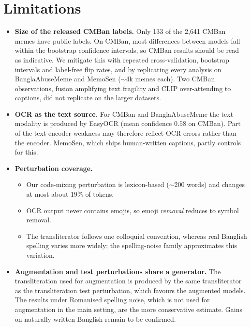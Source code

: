 \section*{Limitations}
\label{sec:limitations}

\begin{itemize}
  \item \textbf{Size of the released CMBan labels.} Only 133 of the 2{,}641 CMBan memes have public labels. On CMBan,
  most differences between models fall within the bootstrap confidence intervals, so CMBan results should be read
  as indicative. We mitigate this with repeated cross-validation, bootstrap intervals and label-free flip rates,
  and by replicating every analysis on BanglaAbuseMeme and MemoSen ($\sim$4k memes each). Two CMBan observations,
  fusion amplifying text fragility and CLIP over-attending to captions, did not replicate on the larger datasets.

  \item \textbf{OCR as the text source.} For CMBan and BanglaAbuseMeme the text modality is produced by EasyOCR
  (mean confidence $0.58$ on CMBan). Part of the text-encoder weakness may therefore reflect OCR errors rather than
  the encoder. MemoSen, which ships human-written captions, partly controls for this.

  \item \textbf{Perturbation coverage.}
  \begin{itemize}
    \item Our code-mixing perturbation is lexicon-based ($\sim$200 words) and changes at most about 19\% of tokens.
    \item OCR output never contains emojis, so emoji \emph{removal} reduces to symbol removal.
    \item The transliterator follows one colloquial convention, whereas real Banglish spelling varies more widely;
    the spelling-noise family approximates this variation.
  \end{itemize}

  \item \textbf{Augmentation and test perturbations share a generator.} The transliteration used for augmentation is
  produced by the same transliterator as the transliteration test perturbation, which favours the augmented models.
  The results under Romanised spelling noise, which is not used for augmentation in the main setting, are the more
  conservative estimate. Gains on naturally written Banglish remain to be confirmed.


\end{itemize}
